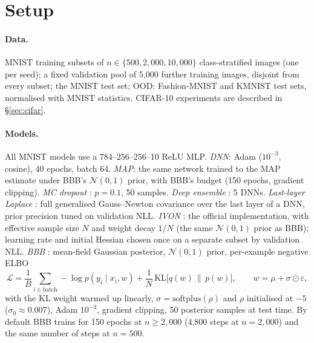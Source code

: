 \documentclass[11pt]{article}
\begin{document}
\section{Setup}\label{sec:setup}
\paragraph{Data.} MNIST training subsets of $n\in\{500, 2{,}000, 10{,}000\}$
class-stratified images (one per seed); a fixed validation pool of 5{,}000
further training images, disjoint from every subset; the MNIST test set; OOD:
Fashion-MNIST \citep{xiao2017fashion} and KMNIST \citep{clanuwat2018deep} test
sets, normalised with MNIST statistics. CIFAR-10 experiments are described in
\S\ref{sec:cifar}.

\paragraph{Models.} All MNIST models use a 784--256--256--10 ReLU MLP.
\emph{DNN}: Adam ($10^{-3}$, cosine), 40 epochs, batch 64. \emph{MAP}: the
same network trained to the MAP estimate under BBB's $\mathcal N(0,1)$ prior,
with BBB's budget (150 epochs, gradient clipping). \emph{MC dropout}
\citep{gal2016dropout}: $p=0.1$, 50 samples. \emph{Deep ensemble}
\citep{lakshminarayanan2017simple}: 5 DNNs. \emph{Last-layer Laplace}
\citep{daxberger2021laplace}: full generalised Gauss--Newton covariance over
the last layer of a DNN, prior precision tuned on validation NLL.
\emph{IVON} \citep{shen2024variational}: the official implementation, with
effective sample size $N$ and weight decay $1/N$ (the same $\mathcal N(0,1)$
prior as BBB); learning rate and initial Hessian chosen once on a separate
subset by validation NLL. \emph{BBB}
\citep{blundell2015weight}: mean-field Gaussian posterior, $\mathcal N(0,1)$
prior, per-example negative ELBO
\begin{equation}
\mathcal{L} = \frac{1}{B}\sum_{i\in\text{batch}} -\log p(y_i\mid x_i, w)
+ \frac{1}{N}\,\mathrm{KL}\big[q(w)\,\|\,p(w)\big], \qquad w=\mu+\sigma\odot\varepsilon,
\label{eq:elbo}
\end{equation}
with the KL weight warmed up linearly, $\sigma=\mathrm{softplus}(\rho)$ and
$\rho$ initialised at $-5$ ($\sigma_0\approx 0.007$), Adam $10^{-3}$, gradient
clipping, 50 posterior samples at test time. By default BBB trains for 150
epochs at $n\ge 2{,}000$ (4{,}800 steps at $n=2{,}000$) and the same number of
steps at $n=500$.
\end{document}
